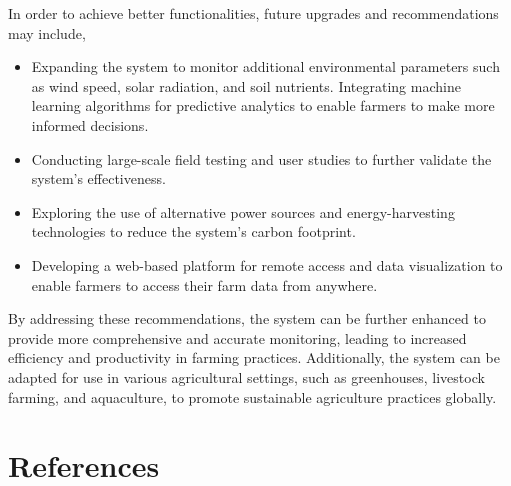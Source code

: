 \documentclass[12pt, a4paper]{article}
\begin{document}
In order to achieve better functionalities, future upgrades and recommendations may include,
\begin{itemize}
   	\item[--] Expanding the system to monitor additional environmental parameters such as wind speed, solar radiation, and soil nutrients.
    \itme[--] Integrating machine learning algorithms for predictive analytics to enable farmers to make more informed decisions.
    \item[--] Conducting large-scale field testing and user studies to further validate the system's effectiveness.
    \item[--] Exploring the use of alternative power sources and energy-harvesting technologies to reduce the system's carbon footprint.
    \item[--] Developing a web-based platform for remote access and data visualization to enable farmers to access their farm data from anywhere.
\end{itemize}

By addressing these recommendations, the system can be further enhanced to provide more comprehensive and accurate monitoring, leading to increased efficiency and productivity in farming practices. Additionally, the system can be adapted for use in various agricultural settings, such as greenhouses, livestock farming, and aquaculture, to promote sustainable agriculture practices globally.

\newpage
\section{References}


\end{document}
